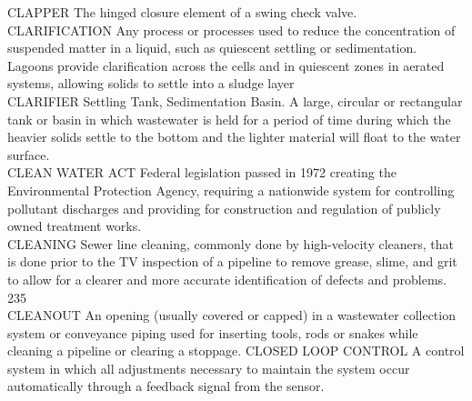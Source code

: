 \documentclass{article}
\begin{document}
CLAPPER
The hinged closure element of a swing check valve.
\vspace{0.3cm}\\
CLARIFICATION
Any process or processes used to reduce the concentration of suspended matter in a liquid, such as quiescent settling or sedimentation. Lagoons provide clarification across the cells and in quiescent zones in aerated systems, allowing solids to settle into a sludge layer
\vspace{0.3cm}\\
CLARIFIER
Settling Tank, Sedimentation Basin. A large, circular or rectangular tank or basin in which wastewater is held for a period of time during which the heavier solids settle to the bottom and the lighter material will float to the water surface.
\vspace{0.3cm}\\
CLEAN WATER ACT
Federal legislation passed in 1972 creating the Environmental Protection Agency, requiring a nationwide system for controlling pollutant discharges and providing for construction and regulation of publicly owned treatment works.
\vspace{0.3cm}\\
CLEANING
Sewer line cleaning, commonly done by high-velocity cleaners, that is done prior to the TV inspection of a pipeline to remove grease, slime, and grit to allow for a clearer and more accurate identification of defects and problems. 235 
\vspace{0.3cm}\\
CLEANOUT
An opening (usually covered or capped) in a wastewater collection system or conveyance piping used for inserting tools, rods or snakes while cleaning a pipeline or clearing a stoppage. 
CLOSED LOOP CONTROL
A control system in which all adjustments necessary to maintain the system occur automatically through a feedback signal from the sensor.
\vspace{0.3cm}\\
\end{document}

